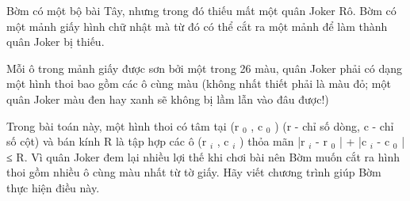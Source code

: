 Bờm có một bộ bài Tây, nhưng trong đó thiếu mất một quân Joker Rô. Bờm có một mảnh giấy hình chữ nhật mà từ đó có thể cắt ra một mảnh để làm thành quân Joker bị thiếu.  

   Mỗi ô trong mảnh giấy được sơn bởi một trong 26 màu, quân Joker phải có dạng một hình thoi bao gồm các ô cùng màu (không nhất thiết phải là màu đỏ; một quân Joker màu đen hay xanh sẽ không bị lầm lẫn vào đâu được!)  

   Trong bài toán này, một hình thoi có tâm tại (r   $_    0   $   , c   $_    0   $   ) (r - chỉ số dòng, c - chỉ số cột) và bán kính R là tập hợp các ô (r   $_    i   $   , c   $_    i   $   ) thỏa mãn |r   $_    i   $   - r   $_    0   $   | + |c   $_    i   $   - c   $_    0   $   | ≤ R. Vì quân Joker đem lại nhiều lợi thế khi chơi bài nên Bờm muốn cắt ra hình thoi gồm nhiều ô cùng màu nhất từ tờ giấy. Hãy viết chương trình giúp Bờm thực hiện điều này.